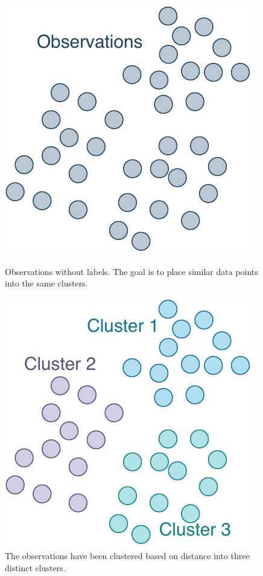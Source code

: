\begin{figure}
  \begin{minipage}{.46\textwidth}
    \includegraphics[scale=0.48,width=\textwidth]{figures/clusters-unassigned}
    \caption{Observations without labels. The goal is to place
      similar data points into the same clusters.}\label{fig:clusters-unassigned}
  \end{minipage}
  \hspace{5pt}
  \begin{minipage}{.46\textwidth}
    \includegraphics[scale=0.5,width=\textwidth]{figures/clusters-assigned}
    \caption{The observations have been clustered based on distance
      into three distinct clusters.}\label{fig:clusters-assigned}
  \end{minipage}
\end{figure}

